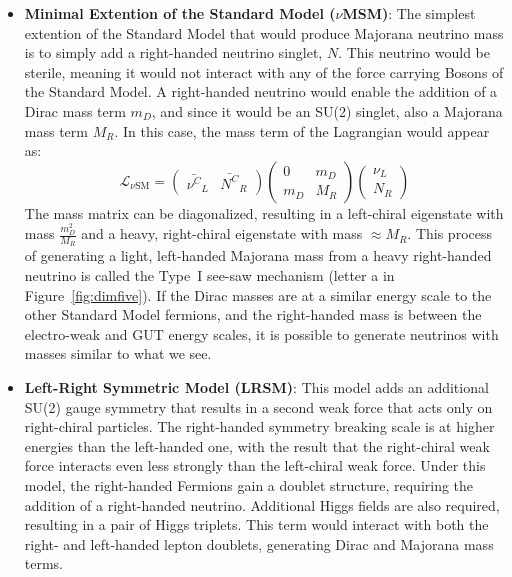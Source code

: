\documentclass[/main.tex]{subfiles}
\begin{document}
\begin{itemize}
\item \textbf{Minimal Extention of the Standard Model ($\nu$MSM)}: The simplest extention of the Standard Model that would produce Majorana neutrino mass is to simply add a right-handed neutrino singlet, $N$.
  This neutrino would be sterile, meaning it would not interact with any of the force carrying Bosons of the Standard Model.
  A right-handed neutrino would enable the addition of a Dirac mass term $m_D$, and since it would be an SU(2) singlet, also a Majorana mass term $M_R$.
  In this case, the mass term of the Lagrangian would appear as:
  \begin{equation}
    \mathcal{L_{\nu\mathrm{SM}}} = \begin{pmatrix} \bar{\nu^C}_L & \bar{N^C}_R \end{pmatrix} \begin{pmatrix} 0 & m_D \\ m_D & M_R \end{pmatrix} \begin{pmatrix} \nu_L \\ N_R \end{pmatrix}
  \end{equation}
  The mass matrix can be diagonalized, resulting in a left-chiral eigenstate with mass $\frac{m_D^2}{M_R}$ and a heavy, right-chiral eigenstate with mass $\approx M_R$.
  This process of generating a light, left-handed Majorana mass from a heavy right-handed neutrino is called the Type~I see-saw mechanism (letter a in Figure~\ref{fig:dimfive}).
  If the Dirac masses are at a similar energy scale to the other Standard Model fermions, and the right-handed mass is between the electro-weak and GUT energy scales, it is possible to generate neutrinos with masses similar to what we see.
\item \textbf{Left-Right Symmetric Model (LRSM)}: This model adds an additional SU(2) gauge symmetry that results in a second weak force that acts only on right-chiral particles.
  The right-handed symmetry breaking scale is at higher energies than the left-handed one, with the result that the right-chiral weak force interacts even less strongly than the left-chiral weak force.
  Under this model, the right-handed Fermions gain a doublet structure, requiring the addition of a right-handed neutrino.
  Additional Higgs fields are also required, resulting in a pair of Higgs triplets.
  This term would interact with both the right- and left-handed lepton doublets, generating Dirac and Majorana mass terms.

\end{itemize}
\end{document}
